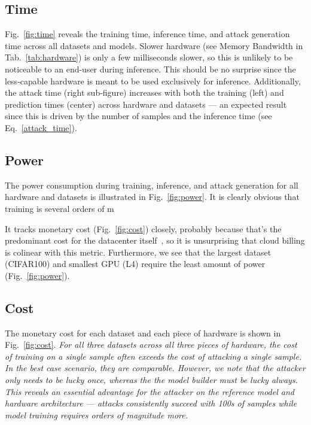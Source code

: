 \documentclass[conference]{IEEEtran}
\newcommand{\cm}[1]{\textit{{\color{blue}#1}}}
\begin{document}
\subsection{Time}
Fig.~\ref{fig:time} reveals the training time, inference time, and attack generation time across all datasets and models. Slower hardware (see Memory Bandwidth in Tab.~\ref{tab:hardware}) is only a few milliseconds slower, so this is unlikely to be noticeable to an end-user during inference. This should be no surprise since the less-capable hardware is meant to be used exclusively for inference. Additionally, the attack time (right sub-figure) increases with both the training (left) and prediction times (center) across hardware and datasets --- an expected result since this is driven by the number of samples and the inference time (see Eq.~\ref{attack_time}).



\subsection{Power}
The power consumption during training, inference, and attack generation for all hardware and datasets is illustrated in Fig.~\ref{fig:power}. It is clearly obvious that training is several orders of m

It tracks monetary cost (Fig.~\ref{fig:cost}) closely, probably because that's the predominant cost for the datacenter itself~\cite{dayarathna2015data}, so it is unsurprising that cloud billing is colinear with this metric. Furthermore, we see that the largest dataset (CIFAR100) and smallest GPU (L4) require the least amount of power (Fig.~\ref{fig:power}). 


\subsection{Cost}
The monetary cost for each dataset and each piece of hardware is shown in Fig.~\ref{fig:cost}. \cm{For all three datasets across all three pieces of hardware, the cost of training on a single sample often exceeds the cost of attacking a single sample. In the best case scenario, they are comparable. However, we note that the attacker only needs to be lucky once, whereas the the model builder must be lucky always. This reveals an essential advantage for the attacker on the reference model and hardware architecture --- attacks consistently succeed with 100s of samples while model training requires orders of magnitude more.}
\end{document}
